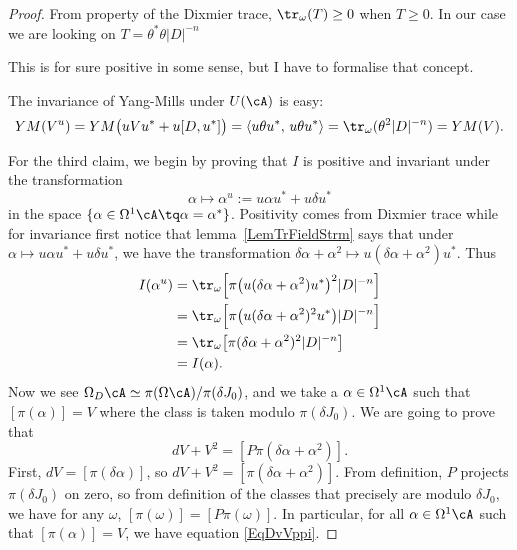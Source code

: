 \begin{proof}
	From property of the Dixmier trace, $\tr_{\omega}(T)\geq 0$ when $T\geq0$. In our case we are looking on $T=\theta^*\theta|D|^{-n}$

	\begin{probleme}
		This is for sure positive in some sense, but I have to formalise that concept.
	\end{probleme}

	The invariance of Yang-Mills under $U(\cA)$ is easy:
	\begin{equation}
		YM(V^{u})=YM\big( uVu^*+u[D,u^*] \big)
		=\langle u\theta u^*,\,u\theta u^*\rangle
		=\tr_{\omega}(\theta^{2}|D|^{-n})
		=YM(V).
	\end{equation}

	For the third claim, we begin by proving that $I$ is positive and invariant under the transformation
	\[
		\alpha\mapsto \alpha^{u}:=u\alpha u^*+u\delta u^*
	\]
	in the space $\{ \alpha\in\Omega^1\cA \tq\alpha=\alpha^* \}$. Positivity comes from Dixmier trace while for invariance first notice that lemma~\ref{LemTrFieldStrm} says that under $\alpha\mapsto u\alpha u^*+u\delta u^*$, we have the transformation $\delta\alpha+\alpha^{2}\mapsto u(\delta\alpha+\alpha^{2})u^*$. Thus
	\begin{align*}
		I(\alpha^{u}) & =\tr_{\omega}\Big[ \pi\big( u(\delta\alpha+\alpha^{2})u^* \big)^{2}|D|^{-n}  \Big] \\
		              & =\tr_{\omega}\Big[ \pi\big( u(\delta\alpha+\alpha^{2})^{2}u^* \big)|D|^{-n}  \Big] \\
		              & =\tr_{\omega}\big[ \pi(\delta\alpha+\alpha^{2})^{2}|D|^{-n} \big]                  \\
		              & =I(\alpha).
	\end{align*}
	Now we see $\Omega_D\cA\simeq\pi(\Omega\cA)/\pi(\delta J_0)$, and we take a $\alpha\in\Omega^1\cA$ such that $[\pi(\alpha)]=V$ where the class is taken modulo $\pi(\delta J_0)$. We are going to prove that
	\begin{equation} \label{EqDvVppi}
		dV+V^{2}=[P\pi(\delta\alpha+\alpha^{2})].
	\end{equation}
	First, $dV=[\pi(\delta\alpha)]$, so $dV+V^{2}=[\pi(\delta\alpha+\alpha^{2})]$. From definition, $P$ projects $\pi(\delta J_0)$ on zero, so from definition of the classes that precisely are modulo $\delta J_0$, we have for any $\omega$, $[\pi(\omega)]=[P\pi(\omega)]$. In particular, for all $\alpha\in\Omega^1\cA$ such that $[\pi(\alpha)]=V$, we have equation \eqref{EqDvVppi}.

\end{proof}

